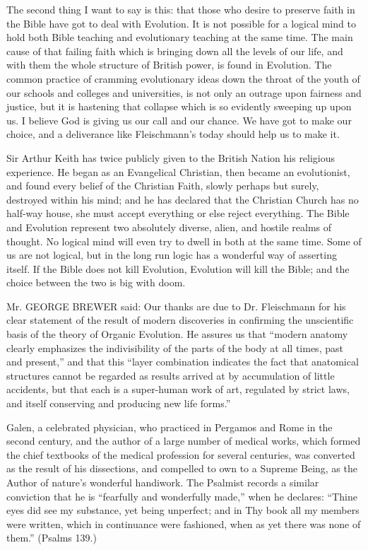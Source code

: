 The second thing I want to say is this: that those who desire to preserve faith in the Bible
have got to deal with Evolution. It is not possible for a logical mind to hold both Bible
teaching and evolutionary teaching at the same time. The main cause of that failing faith
which is bringing down all the levels of our life, and with them the whole structure of British
power, is found in Evolution. The common practice of cramming evolutionary ideas down
the throat of the youth of our schools and colleges and universities, is not only an outrage
upon fairness and justice, but it is hastening that collapse which is so evidently sweeping up
upon us. I believe God is giving us our call and our chance. We have got to make our choice,
and a deliverance like Fleischmann's today should help us to make it.

Sir Arthur Keith has twice publicly given to the British Nation his religious experience. He
began as an Evangelical Christian, then became an evolutionist, and found every belief of the
Christian Faith, slowly perhaps but surely, destroyed within his mind; and he has declared
that the Christian Church has no half-way house, she must accept everything or else reject
everything. The Bible and Evolution represent two absolutely diverse, alien, and hostile
realms of thought. No logical mind will even try to dwell in both at the same time. Some of
us are not logical, but in the long run logic has a wonderful way of asserting itself. If the
Bible does not kill Evolution, Evolution will kill the Bible; and the choice between the two is
big with doom.

Mr. GEORGE BREWER said: Our thanks are due to Dr. Fleischmann for his clear statement
of the result of modern discoveries in confirming the unscientific basis of the theory of
Organic Evolution. He assures us that ``modern anatomy clearly emphasizes the indivisibility
of the parts of the body at all times, past and present,'' and that this ``layer combination
indicates the fact that anatomical structures cannot be regarded as results arrived at by
accumulation of little accidents, but that each is a super-human work of art, regulated by
strict laws, and itself conserving and producing new life forms.''

Galen, a celebrated physician, who practiced in Pergamos and Rome in the second century,
and the author of a large number of medical works, which formed the chief textbooks of the
medical profession for several centuries, was converted as the result of his dissections, and
compelled to own to a Supreme Being, as the Author of nature's wonderful handiwork. The
Psalmist records a similar conviction that he is ``fearfully and wonderfully made,'' when he
declares: ``Thine eyes did see my substance, yet being unperfect; and in Thy book all my
members were written, which in continuance were fashioned, when as yet there was none of
them.'' (Psalms 139.)

